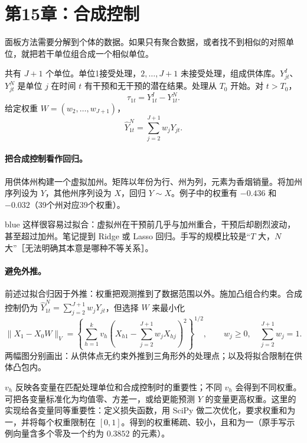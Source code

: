 {\section{第15章：合成控制}
面板方法需要分解到个体的数据。如果只有聚合数据，或者找不到相似的对照单位，就把若干单位组合成一个相似单位。

共有 $J+1$ 个单位。单位1接受处理，$2,\ldots,J+1$ 未接受处理，组成供体库。$Y_{jt}^{I}$、$Y_{jt}^{N}$ 是单位 $j$ 在时间 $t$ 有干预和无干预的潜在结果。处理从 $T_0$ 开始。对 $t>T_0$，
\[\tau_{1t}=Y_{1t}^{I}-Y_{1t}^{N}.\]
 给定权重 $W=(w_2,\ldots,w_{J+1})$，
\[\widehat Y_{1t}^{N}=\sum_{j=2}^{J+1}w_jY_{jt}.\]

\paragraph{把合成控制看作回归。}
用供体州构建一个虚拟加州。矩阵以年份为行、州为列，元素为香烟销量。将加州序列设为 $Y$，其他州序列设为 $X$，回归 $Y\sim X$。例子中的权重有 $-0.436$ 和 $-0.032$（39个州对应39个权重）。

\begin{inkblock}{blue}
这样很容易过拟合：虚拟州在干预前几乎与加州重合，干预后却剧烈波动，甚至超过加州。笔记提到 Ridge 或 Lasso 回归。手写的规模比较是“$T$ 大，$N$ 大”［无法明确其本意是哪种不等关系］。
\end{inkblock}

\paragraph{避免外推。}
前述过拟合归因于外推：权重把观测推到了数据范围以外。施加凸组合约束。合成控制仍为 $\widehat Y_{1t}^{N}=\sum_{j=2}^{J+1}w_jY_{jt}$，但选择 $W$ 来最小化
\[\|X_1-X_0W\|_V=
\left\{\sum_{h=1}^{k}v_h\left(X_{h1}-\sum_{j=2}^{J+1}w_jX_{hj}\right)^2\right\}^{1/2},
\qquad w_j\ge0,\quad\sum_{j=2}^{J+1}w_j=1.
\]
两幅图分别画出：从供体点无约束外推到三角形外的处理点；以及将拟合限制在供体凸包内。

$v_h$ 反映各变量在匹配处理单位和合成控制时的重要性；不同 $v_h$ 会得到不同权重。可把各变量标准化为均值零、方差一，或给更能预测 $Y$ 的变量更高权重。这里的实现给各变量同等重要性：定义损失函数，用 SciPy 做二次优化，要求权重和为一，并将每个权重限制在 $[0,1]$。得到的权重稀疏、较小，且和为一（原手写示例向量含多个零及一个约为 $0.3852$ 的元素）。

}
